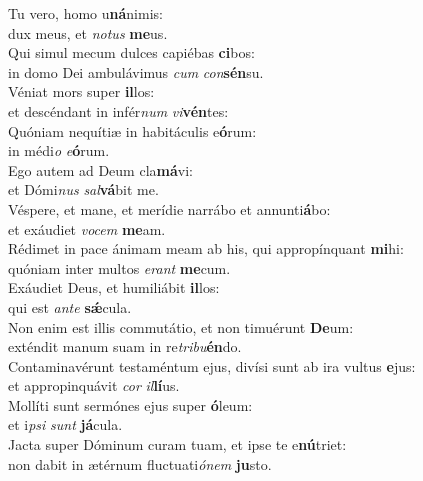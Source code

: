 \evenverse Tu vero, homo u\textbf{ná}nimis:~\*\\
\evenverse dux meus, et \textit{no}\textit{tus} \textbf{me}us.\\
\oddverse Qui simul mecum dulces capiébas \textbf{ci}bos:~\*\\
\oddverse in domo Dei ambulávimus \textit{cum} \textit{con}\textbf{sén}su.\\
\evenverse Véniat mors super \textbf{il}los:~\*\\
\evenverse et descéndant in infér\textit{num} \textit{vi}\textbf{vén}tes:\\
\oddverse Quóniam nequítiæ in habitáculis e\textbf{ó}rum:~\*\\
\oddverse in médi\textit{o} \textit{e}\textbf{ó}rum.\\
\evenverse Ego autem ad Deum cla\textbf{má}vi:~\*\\
\evenverse et Dómi\textit{nus} \textit{sal}\textbf{vá}bit me.\\
\oddverse Véspere, et mane, et merídie narrábo et annunti\textbf{á}bo:~\*\\
\oddverse et exáudiet \textit{vo}\textit{cem} \textbf{me}am.\\
\evenverse Rédimet in pace ánimam meam ab his, qui appropínquant \textbf{mi}hi:~\*\\
\evenverse quóniam inter multos \textit{e}\textit{rant} \textbf{me}cum.\\
\oddverse Exáudiet Deus, et humiliábit \textbf{il}los:~\*\\
\oddverse qui est \textit{an}\textit{te} \textbf{sǽ}cula.\\
\evenverse Non enim est illis commutátio, et non timuérunt \textbf{De}um:~\*\\
\evenverse exténdit manum suam in re\textit{tri}\textit{bu}\textbf{én}do.\\
\oddverse Contaminavérunt testaméntum ejus, divísi sunt ab ira vultus \textbf{e}jus:~\*\\
\oddverse et appropinquávit \textit{cor} \textit{il}\textbf{lí}us.\\
\evenverse Mollíti sunt sermónes ejus super \textbf{ó}leum:~\*\\
\evenverse et i\textit{psi} \textit{sunt} \textbf{já}cula.\\
\oddverse Jacta super Dóminum curam tuam, et ipse te e\textbf{nú}triet:~\*\\
\oddverse non dabit in ætérnum fluctuati\textit{ó}\textit{nem} \textbf{ju}sto.\\
